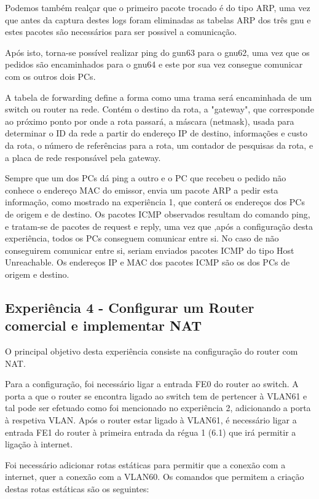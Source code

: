 \documentclass[article, a4paper, 11pt, oneside]{memoir}
\begin{document}
Podemos também realçar que o primeiro pacote trocado é do tipo ARP, uma vez que antes da captura destes logs foram eliminadas as tabelas ARP dos três gnu e estes pacotes são necessários
para ser possivel a comunicação.

Após isto, torna-se possível realizar ping do gun63 para o gnu62, uma vez que os pedidos são encaminhados para o gnu64 e este por sua vez consegue comunicar com os outros dois PCs.

A tabela de forwarding define a forma como uma trama será encaminhada de um switch ou router na rede. Contém o destino da rota, a "gateway", que corresponde ao próximo ponto por onde a rota passará,
a máscara (netmask), usada para determinar o ID da rede a partir do endereço IP de destino, informações e custo da rota, o número de referências para a rota, um contador de pesquisas da rota, e a placa de rede responsável pela gateway.

Sempre que um dos PCs dá ping a outro e o PC que recebeu o pedido não conhece o endereço MAC do emissor, envia um pacote ARP a pedir esta informação, como mostrado na experiência 1, que conterá os endereços dos PCs de origem e de destino.
Os pacotes ICMP observados resultam do comando ping, e tratam-se de pacotes de request e reply, uma vez que ,após a configuração desta experiência, todos os PCs conseguem comunicar entre si.
No caso de não conseguirem comunicar entre si, seriam enviados pacotes ICMP do tipo Host Unreachable.
Os endereços IP e MAC dos pacotes ICMP são os dos PCs de origem e destino.

\subsection{Experiência 4 - Configurar um Router comercial e implementar NAT}

O principal objetivo desta experiência consiste na configuração do router com NAT.

Para a configuração, foi necessário ligar a entrada FE0 do router ao switch.
A porta a que o router se encontra ligado ao switch tem de pertencer à VLAN61 e tal pode ser efetuado como foi
mencionado no experiência 2, adicionando a porta à respetiva VLAN. Após o router estar ligado à VLAN61, 
é necessário ligar a entrada FE1 do router à primeira entrada da régua 1 (6.1) que irá permitir a ligação à internet.

Foi necessário adicionar rotas estáticas para permitir que a conexão com a internet, quer a conexão com a VLAN60.
Os comandos que permitem a criação destas rotas estáticas são os seguintes:
\end{document}
